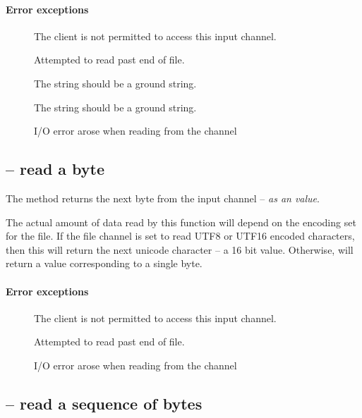 \paragraph{Error exceptions}
\begin{description}
\item[]
The client is not permitted to access this input channel.
\item[]
Attempted to read past end of file.
\item[]
The  string should be a ground string.
\item[]
The  string should be a ground string.
\item[]
I/O error arose when reading from the channel
\end{description}

\subsection{ -- read a byte}
\label{io:inByte}


The  method returns the next byte from the input channel -- \emph{as an  value}.

\begin{aside}
The actual amount of data read by this function will depend on the encoding set for the file. If the file channel is set to read UTF8 or UTF16 encoded characters, then this will return the next unicode character -- a 16 bit value. Otherwise,  will return a value corresponding to a single byte.
\end{aside}

\paragraph{Error exceptions}
\begin{description}
\item[]
The client is not permitted to access this input channel.
\item[]
Attempted to read past end of file.
\item[]
I/O error arose when reading from the channel
\end{description}

\subsection{ -- read a sequence of bytes}
\label{io:inBytes}

